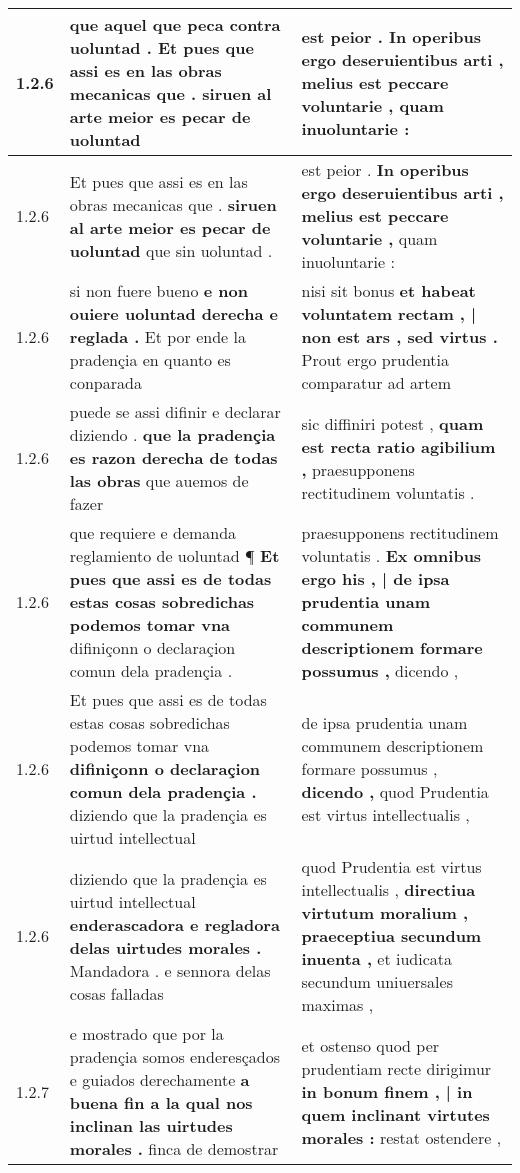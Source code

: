 \begin{tabular}{|p{1cm}|p{6.5cm}|p{6.5cm}|}
1.2.6 & que aquel que peca contra uoluntad . \textbf{ Et pues que assi es en las obras mecanicas que . } siruen al arte meior es pecar de uoluntad & est peior . \textbf{ In operibus ergo deseruientibus arti , melius est peccare voluntarie , } quam inuoluntarie : \\\hline
1.2.6 & Et pues que assi es en las obras mecanicas que . \textbf{ siruen al arte meior es pecar de uoluntad } que sin uoluntad . & est peior . \textbf{ In operibus ergo deseruientibus arti , melius est peccare voluntarie , } quam inuoluntarie : \\\hline
1.2.6 & si non fuere bueno \textbf{ e non ouiere uoluntad derecha e reglada . } Et por ende la pradençia en quanto es conparada & nisi sit bonus \textbf{ et habeat voluntatem rectam , | non est ars , sed virtus . } Prout ergo prudentia comparatur ad artem \\\hline
1.2.6 & puede se assi difinir e declarar diziendo . \textbf{ que la pradençia es razon derecha de todas las obras } que auemos de fazer & sic diffiniri potest , \textbf{ quam est recta ratio agibilium , } praesupponens rectitudinem voluntatis . \\\hline
1.2.6 & que requiere e demanda reglamiento de uoluntad ¶ \textbf{ Et pues que assi es de todas estas cosas sobredichas podemos tomar vna } difiniçonn o declaraçion comun dela pradençia . & praesupponens rectitudinem voluntatis . \textbf{ Ex omnibus ergo his , | de ipsa prudentia unam communem descriptionem formare possumus , } dicendo , \\\hline
1.2.6 & Et pues que assi es de todas estas cosas sobredichas podemos tomar vna \textbf{ difiniçonn o declaraçion comun dela pradençia . } diziendo que la pradençia es uirtud intellectual & de ipsa prudentia unam communem descriptionem formare possumus , \textbf{ dicendo , } quod Prudentia est virtus intellectualis , \\\hline
1.2.6 & diziendo que la pradençia es uirtud intellectual \textbf{ enderascadora e regladora delas uirtudes morales . } Mandadora . e sennora delas cosas falladas & quod Prudentia est virtus intellectualis , \textbf{ directiua virtutum moralium , praeceptiua secundum inuenta , } et iudicata secundum uniuersales maximas , \\\hline
1.2.7 & e mostrado que por la pradençia somos enderesçados e guiados derechamente \textbf{ a buena fin a la qual nos inclinan las uirtudes morales . } finca de demostrar & et ostenso quod per prudentiam recte dirigimur \textbf{ in bonum finem , | in quem inclinant virtutes morales : } restat ostendere , \\\hline

\end{tabular}
